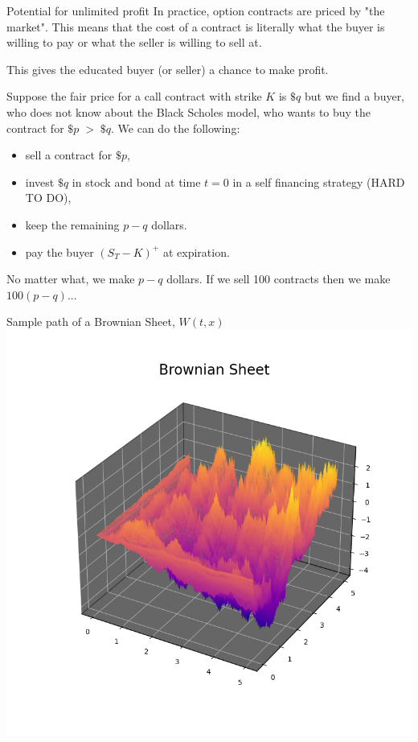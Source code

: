 \documentclass{beamer}%
\numberwithin{equation}{section}
\begin{document}
	\begin{frame}{Potential for unlimited profit}
		In practice, option contracts are priced by "the market". This means that the cost of a contract is literally what the buyer is willing to pay or what the seller is willing to sell at. 
		
		\vspace{.1in}
		
		This gives the educated buyer (or seller) a chance to make profit. 
		
		\vspace{.1in}
		
		Suppose the fair price for a call contract with strike $K$ is $\$q$ but we find a buyer, who does not know about the Black Scholes model, who wants to buy the contract for $\$p \; > \; \$q$. We can do the following:
		\begin{itemize}
			\item sell a contract for $\$p$,
			\item invest $\$q$ in stock and bond at time $t=0$ in a self financing strategy (HARD TO DO),
			\item keep the remaining $p-q$ dollars.
			\item pay the buyer $(S_T -K)^+$ at expiration.
		\end{itemize}
		No matter what, we make $p - q$ dollars. If we sell 100 contracts then we make $100(p-q)$...
		
	\end{frame}
	
	\begin{frame}{Sample path of a Brownian Sheet, $W(t,x)$}
		\centering
		\includegraphics[scale=.5]{bsheet4.png}
	\end{frame}
	
\end{document}

